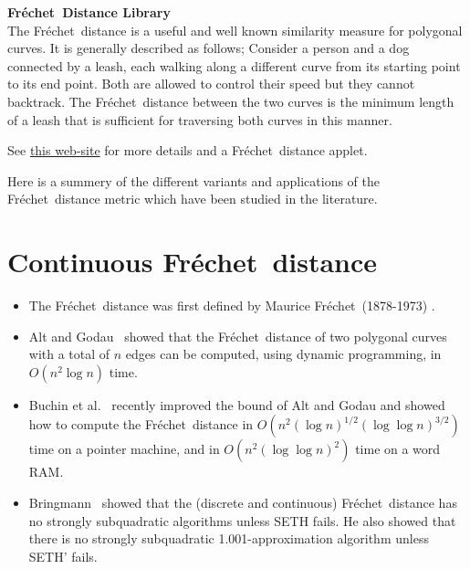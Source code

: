 \documentclass[a4paper,onecolumn]{article}
\date{}
\numberwithin{equation}{section}
\numberwithin{figure}{section}
\numberwithin{algorithm}{section}
\theoremstyle{plain}
\theoremstyle{definition}
\theoremstyle{remark}
\newcommand{\frechet}{Fr\'echet}
\begin{document}
{\Huge \bfseries \frechet\ Distance Library} \\

The \frechet\ distance is a useful and well known similarity measure for polygonal curves.
It is generally described as follows; Consider a
person and a dog connected by a leash, each walking along a different curve
from its starting point to its end point. Both are allowed to control
their speed but they cannot backtrack. The \frechet\ distance between
the two curves is the minimum length of a leash that is sufficient
for traversing both curves in this manner.

See \href{http://www.cim.mcgill.ca/~stephane/cs507/Project.html}{this web-site} for more details and a \frechet\ distance applet.

Here is a summery of the different variants and applications of the \frechet\ distance metric which have been studied in the literature.
\tableofcontents{}

\section{Continuous \frechet\ distance}
\begin{itemize}
\item The \frechet\ distance was first defined by Maurice \frechet\ (1878-1973) \cite{Frechet1906}.
\item Alt and Godau~\cite{AltG95} showed that the \frechet\ distance of two polygonal curves with a total of $n$ edges can be computed, using dynamic programming, in $O(n^{2}\log n)$ time.
\item Buchin et al.~\cite{BuchinBMM14} recently improved the bound of Alt and Godau and showed how to compute the \frechet\ distance in $O(n^2 (\log n)^{1/2} (\log\log n)^{3/2})$ time on a pointer machine, and in $O(n^2 (\log\log n)^2)$ time on a word RAM.
\item Bringmann~\cite{Bringmann14} showed that the (discrete and continuous) \frechet\ distance has no strongly subquadratic algorithms unless SETH fails. He also showed that there is no strongly subquadratic 1.001-approximation algorithm unless SETH' fails.
\end{itemize}
\end{document}
